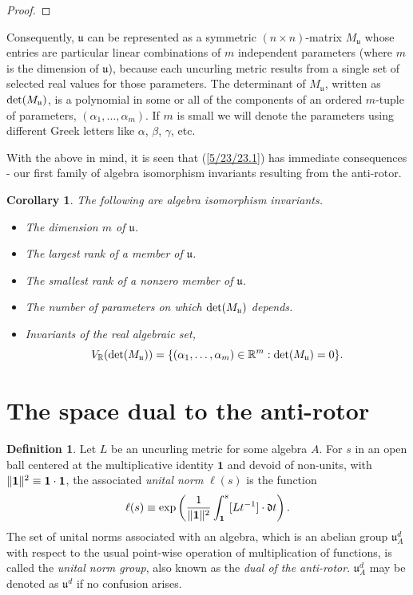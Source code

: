 \documentclass{amsart}
\numberwithin{equation}{section}
\newtheorem{corollary}[theorem]{Corollary}
\theoremstyle{definition}
\newtheorem{definition}[theorem]{Definition}
\numberwithin{theorem}{section}
\begin{document}
\begin{proof}
\end{proof}

Consequently, $\mathfrak{u}$ can be represented as a symmetric $(n\times n)$-matrix $M_{\mathfrak{u}}$ whose entries are particular linear combinations of $m$ independent parameters (where $m$ is the dimension of $\mathfrak{u}$), because each uncurling metric results from a single set of selected real values for those parameters.  The determinant of $M_{\mathfrak{u}}$, written as ${\rm det}(M_{\mathfrak{u}})$, is a polynomial in some or all of the components of an ordered $m$-tuple of parameters, $(\alpha_1,\dots,\alpha_m)$.  If $m$ is small  we will denote the parameters using different Greek letters like $\alpha$, $\beta$, $\gamma$, etc. 

   With the above in mind, it is seen that (\ref{5/23/23.1}) has immediate consequences - our first family of algebra isomorphism invariants resulting from the anti-rotor. 
           
  \begin{corollary}\label{8/18/23.2} The following are algebra isomorphism invariants. \begin{itemize} \item The dimension $m$ of $\mathfrak{u}$.   \item The largest rank  of a member of $\mathfrak{u}$.  \item The smallest rank of a nonzero member of $\mathfrak{u}$. \item The number of parameters on which ${\rm det}(M_{\mathfrak{u}})$ depends. \item Invariants of the real algebraic set, \[V_\mathbb{R}({\rm det}(M_{\mathfrak{u}})) = \{(\alpha_1,\dots,\alpha_m)\in\mathbb{R}^m: {\rm det}(M_{\mathfrak{u}}) = 0 \}.\] \end{itemize} \end{corollary}


\section{The space dual to the anti-rotor}
\enlargethispage{1cm}
  \begin{definition}\label{9/21/23.2} Let $L$ be an uncurling metric for some algebra $A$.  For $s$ in an open ball centered at the multiplicative identity $\mathbf{1}$ and devoid of non-units, with $\|{\bf 1}\|^2 \equiv \mathbf{1}\cdot\mathbf{1}$, the associated {\it unital norm} $ \ell(s)$ is the function 
  \begin{equation}\label{11/7/20.2}   \ell(s) \equiv \exp\left(\frac{1}{\|{\bf 1}\|^2}\int_{\bf 1}^s [Lt^{-1}]\cdot \mathfrak{d}t\right).\end{equation} 
   The set of unital norms associated with an algebra, which is an abelian group $\mathfrak{u}^d_A$ with respect to the usual point-wise operation of multiplication of functions, is called the {\it unital norm group}, also known as the {\it dual of the anti-rotor}. $\mathfrak{u}^d_A$ may be denoted as $\mathfrak{u}^d$ if no confusion arises. \end{definition} 
   
\end{document}
